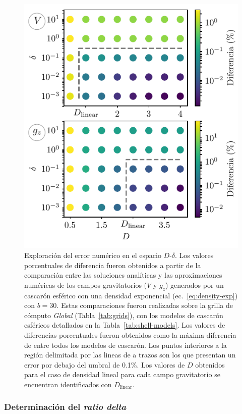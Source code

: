 \begin{figure}
\centering
\includegraphics[width=0.5\linewidth]{figs/tesseroids-variable-density/grid-search.pdf}
\caption{
    Exploración del error numérico en el espacio $D$-$\delta$.
    Los valores porcentuales de diferencia fueron obtenidos a partir de la
    comparación entre las soluciones analíticas y las aproximaciones numéricas
    de los campos gravitatorios ($V$ y $g_z$) generados por un cascarón
    esférico con una densidad exponencial
    (ec.~\ref{eq:density-exp}) con $b=30$.
    Estas comparaciones fueron realizadas sobre la grilla de cómputo
    \emph{Global} (Tabla~\ref{tab:grids}), con los modelos de cascarón
    esféricos detallados en la Tabla~\ref{tab:shell-models}.
    Los valores de diferencias porcentuales fueron obtenidos como la máxima
    diferencia de entre todos los modelos de cascarón.
    Los puntos interiores a la región delimitada por las lineas de a trazos son
    los que presentan un error por debajo del umbral de 0.1\%.
    Los valores de $D$ obtenidos para el caso de densidad lineal para cada
    campo gravitatorio se encuentran identificados con $D_\text{linear}$.
    }
\label{fig:grid-search}
\end{figure}


\subsubsection{Determinación del \emph{ratio delta}}

